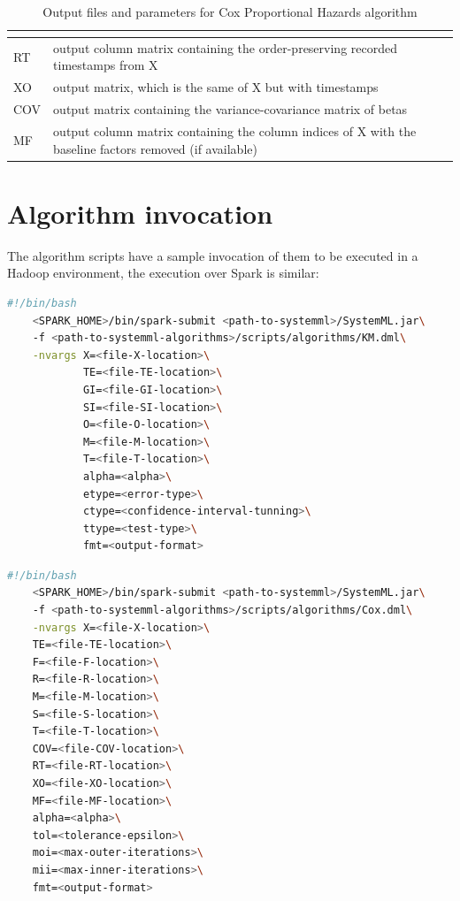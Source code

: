 \documentclass[11pt]{book} %
\begin{document}
\begin{table}[!h]
\begin{tabular}{|>{\centering\arraybackslash}m{}|m{}|}
\begin{itemize}
            \end{itemize}
            \\ \hline
            RT & output column matrix containing the order-preserving recorded timestamps from X \\ \hline
            XO & output matrix, which is the same of X but with timestamps \\ \hline
            COV & output matrix containing the variance-covariance matrix of betas \\ \hline
            MF & output column matrix containing the column indices of X with the baseline factors removed (if available) \\ \hline
        \end{tabular}
        \caption{Output files and parameters for Cox Proportional Hazards algorithm}
        \label{tab:Cox_IO_files}
      \end{table}

\newpage

  \section{Algorithm invocation}

    The algorithm scripts have a sample invocation of them to be executed in a Hadoop environment, the execution over Spark is similar:

    \begin{lstlisting}[label=code:km-invocation-spark, language=sh, caption=Example of the invocation of the Kaplan-Meier Estimates model with Apache SystemML over an Apache Spark framework]
    #!/bin/bash
    <SPARK_HOME>/bin/spark-submit <path-to-systemml>/SystemML.jar\
    -f <path-to-systemml-algorithms>/scripts/algorithms/KM.dml\
    -nvargs X=<file-X-location>\
            TE=<file-TE-location>\
            GI=<file-GI-location>\
            SI=<file-SI-location>\
            O=<file-O-location>\
            M=<file-M-location>\
            T=<file-T-location>\
            alpha=<alpha>\
            etype=<error-type>\
            ctype=<confidence-interval-tunning>\
            ttype=<test-type>\
            fmt=<output-format>
    \end{lstlisting}

    \begin{lstlisting}[label=code:km-invocation-spark, language=sh, caption=Example of the invocation of the Cox Proportional Hazard model with Apache SystemML over an Apache Spark framework]
    #!/bin/bash
    <SPARK_HOME>/bin/spark-submit <path-to-systemml>/SystemML.jar\
    -f <path-to-systemml-algorithms>/scripts/algorithms/Cox.dml\
    -nvargs X=<file-X-location>\
    TE=<file-TE-location>\
    F=<file-F-location>\
    R=<file-R-location>\
    M=<file-M-location>\
    S=<file-S-location>\
    T=<file-T-location>\
    COV=<file-COV-location>\
    RT=<file-RT-location>\
    XO=<file-XO-location>\
    MF=<file-MF-location>\
    alpha=<alpha>\
    tol=<tolerance-epsilon>\
    moi=<max-outer-iterations>\
    mii=<max-inner-iterations>\
    fmt=<output-format>
    \end{lstlisting}
\end{document}
